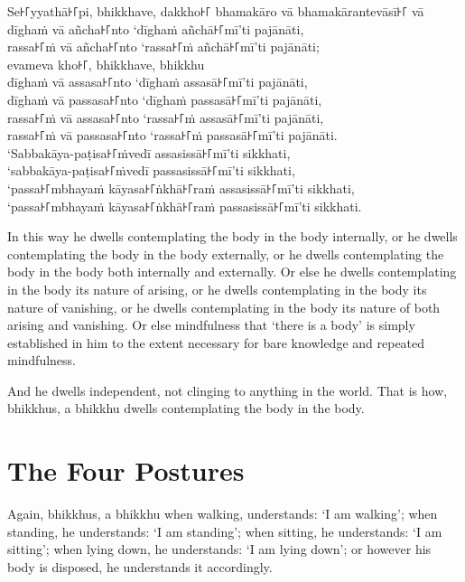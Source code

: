 Se꜔꜒yyathā꜔꜒pi, bhikkhave, dakkho꜔꜒ bhamakāro vā bhamakārantevāsī꜔꜒ vā\\
dīghaṁ vā añcha꜔꜒nto ‘dīghaṁ añchā꜔꜒mī’ti pajānāti,\\
rassa꜔꜒ṁ vā añcha꜔꜒nto ‘rassa꜔꜒ṁ añchā꜔꜒mī’ti pajānāti;\\
evameva kho꜔꜒, bhikkhave, bhikkhu\\
dīghaṁ vā assasa꜔꜒nto ‘dīghaṁ assasā꜔꜒mī’ti pajānāti,\\
dīghaṁ vā passasa꜔꜒nto ‘dīghaṁ passasā꜔꜒mī’ti pajānāti,\\
rassa꜔꜒ṁ vā assasa꜔꜒nto ‘rassa꜔꜒ṁ assasā꜔꜒mī’ti pajānāti,\\
rassa꜔꜒ṁ vā passasa꜔꜒nto ‘rassa꜔꜒ṁ passasā꜔꜒mī’ti pajānāti.\\
‘Sabbakāya-paṭisa꜔꜒ṁvedī assasissā꜔꜒mī’ti sikkhati,\\
‘sabbakāya-paṭisa꜔꜒ṁvedī passasissā꜔꜒mī’ti sikkhati,\\
‘passa꜔꜒mbhayaṁ kāyasa꜔꜒ṅkhā꜔꜒raṁ assasissā꜔꜒mī’ti sikkhati,\\
‘passa꜔꜒mbhayaṁ kāyasa꜔꜒ṅkhā꜔꜒raṁ passasissā꜔꜒mī’ti sikkhati.

\englishPage

In this way he dwells contemplating the body in the body internally, or he
dwells contemplating the body in the body externally, or he dwells contemplating
the body in the body both internally and externally. Or else he dwells
contemplating in the body its nature of arising, or he dwells contemplating in
the body its nature of vanishing, or he dwells contemplating in the body its
nature of both arising and vanishing. Or else mindfulness that ‘there is a body’
is simply established in him to the extent necessary for bare knowledge and
repeated mindfulness.

And he dwells independent, not clinging to anything in the world. That is how,
bhikkhus, a bhikkhu dwells contemplating the body in the body.


\section{The Four Postures}

Again, bhikkhus, a bhikkhu when walking, understands: ‘I am walking’; when
standing, he understands: ‘I am standing’; when sitting, he understands: ‘I am
sitting’; when lying down, he understands: ‘I am lying down’; or however his
body is disposed, he understands it accordingly.

